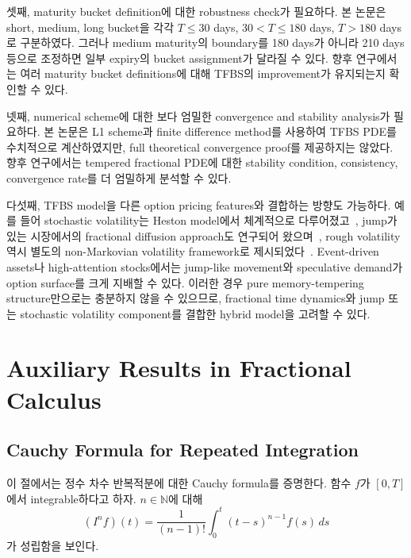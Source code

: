 \documentclass[11pt,a4paper]{report}
\begin{document}
셋째, maturity bucket definition에 대한 robustness check가 필요하다. 본 논문은 short, medium, long bucket을 각각 \(T\le30\) days, \(30<T\le180\) days, \(T>180\) days로 구분하였다. 그러나 medium maturity의 boundary를 180 days가 아니라 210 days 등으로 조정하면 일부 expiry의 bucket assignment가 달라질 수 있다. 향후 연구에서는 여러 maturity bucket definitions에 대해 TFBS의 improvement가 유지되는지 확인할 수 있다.

넷째, numerical scheme에 대한 보다 엄밀한 convergence and stability analysis가 필요하다. 본 논문은 L1 scheme과 finite difference method를 사용하여 TFBS PDE를 수치적으로 계산하였지만, full theoretical convergence proof를 제공하지는 않았다. 향후 연구에서는 tempered fractional PDE에 대한 stability condition, consistency, convergence rate를 더 엄밀하게 분석할 수 있다.

다섯째, TFBS model을 다른 option pricing features와 결합하는 방향도 가능하다. 예를 들어 stochastic volatility는 Heston model에서 체계적으로 다루어졌고~\cite{Heston1993}, jump가 있는 시장에서의 fractional diffusion approach도 연구되어 왔으며~\cite{CarteaDelCastilloNegrete2007}, rough volatility 역시 별도의 non-Markovian volatility framework로 제시되었다~\cite{GatheralJaissonRosenbaum2018}. Event-driven assets나 high-attention stocks에서는 jump-like movement와 speculative demand가 option surface를 크게 지배할 수 있다. 이러한 경우 pure memory-tempering structure만으로는 충분하지 않을 수 있으므로, fractional time dynamics와 jump 또는 stochastic volatility component를 결합한 hybrid model을 고려할 수 있다.















\appendix

\chapter{Auxiliary Results in Fractional Calculus}

\section{Cauchy Formula for Repeated Integration}

이 절에서는 정수 차수 반복적분에 대한 Cauchy formula를 증명한다. 함수 $f$가 $[0,T]$에서 integrable하다고 하자. $n\in\mathbb{N}$에 대해
\[
(I^n f)(t)
=
\frac{1}{(n-1)!}
\int_0^t
(t-s)^{n-1}f(s)\,ds
\]
가 성립함을 보인다.
\end{document}
